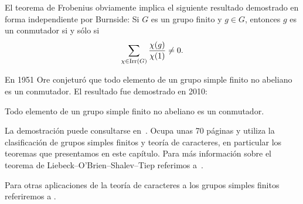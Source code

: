 El teorema de Frobenius obviamente implica 
el siguiente resultado demostrado en forma independiente 
por Burnside: Si $G$ es un 
grupo finito y $g\in G$, entonces $g$ 
es un conmutador si y sólo si 
\[
\sum_{\chi\in\operatorname{Irr}(G)}\frac{\chi(g)}{\chi(1)}\ne 0.
\]

En 1951 Ore conjeturó que todo elemento de un grupo simple finito no abeliano es un conmutador. 
El resultado fue demostrado en 2010:

\begin{theorem}
Todo elemento de un grupo simple finito no abeliano es un conmutador. 
\end{theorem}

La demostración puede consultarse en~\cite{MR2654085}. Ocupa unas 70 páginas y 
utiliza la clasificación de grupos simples finitos y teoría de caracteres, 
en particular los teoremas que presentamos en este capítulo. Para más información sobre 
el teorema de Liebeck--O'Brien--Shalev--Tiep
referimos a~\cite{MR3289286}.

Para otras aplicaciones de la teoría de caracteres a los grupos simples finitos referiremos a 
\cite{MR3821142}. 